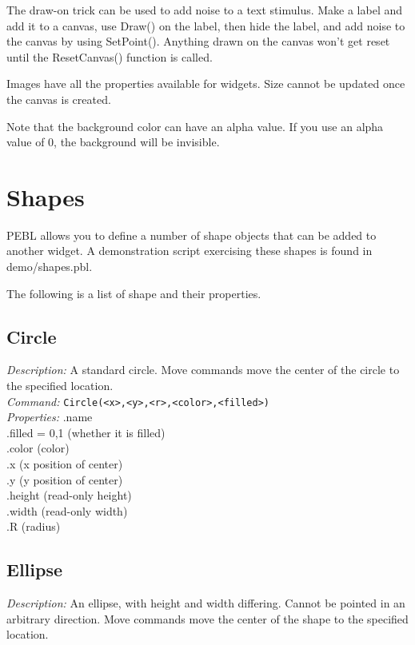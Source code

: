 The draw-on trick can be used to add noise to a text stimulus.  Make
a label and add it to a canvas, use Draw() on the label, then hide the
label, and add noise to the canvas by using SetPoint().
Anything drawn on the canvas won't get reset until the ResetCanvas()
function is called.

Images have all the properties available for widgets.  Size cannot be
updated once the canvas is created.

Note that the background color can have an alpha value.  If you use an
alpha value of 0, the background will be invisible.


\section{Shapes}
PEBL allows you to define a number of shape objects that can be added
to another widget.  A demonstration script exercising these shapes is found in demo/shapes.pbl.

The following is a list of shape and their properties.

\subsection{Circle}
\emph{Description:} A standard circle.  Move commands move the center
  of the circle to the specified location.\\

\emph{Command:}  \verb+Circle(<x>,<y>,<r>,<color>,<filled>)+\\

\emph{Properties:}
.name\\
.filled = {0,1} (whether it is filled)\\
.color (color) \\
.x  (x position of center) \\
.y  (y position of center)\\
.height (read-only height)\\
.width (read-only width)\\
.R  (radius)\\

\subsection{Ellipse}

\emph{Description:} An ellipse, with height and width differing.
  Cannot be pointed in an arbitrary direction.  Move commands move the center
  of the shape to the specified location.

